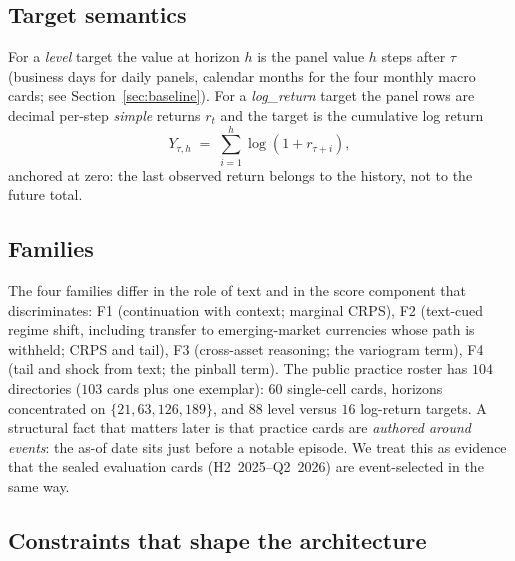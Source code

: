 \subsection{Target semantics}

For a \emph{level} target the value at horizon $h$ is the panel value $h$ steps after $\tau$ (business days for daily panels, calendar
months for the four monthly macro cards; see Section~\ref{sec:baseline}). For a \emph{log\_return} target the panel rows are decimal
per-step \emph{simple} returns $r_t$ and the target is the cumulative log return
\begin{equation}
  Y_{\tau,h} \;=\; \sum_{i=1}^{h}\log(1+r_{\tau+i}),
\end{equation}
anchored at zero: the last observed return belongs to the history, not to the future total.

\subsection{Families}

The four families differ in the role of text and in the score component that discriminates:
F1 (continuation with context; marginal CRPS), F2 (text-cued regime shift, including transfer to emerging-market currencies whose
path is withheld; CRPS and tail), F3 (cross-asset reasoning; the variogram term), F4 (tail and shock from text; the pinball term).
The public practice roster has $104$ directories ($103$ cards plus one exemplar): $60$ single-cell cards, horizons concentrated on
$\{21,63,126,189\}$, and $88$ level versus $16$ log-return targets. A structural fact that matters later is that practice cards are
\emph{authored around events}: the as-of date sits just before a notable episode. We treat this as evidence that the sealed evaluation
cards (H2~2025--Q2~2026) are event-selected in the same way.

\subsection{Constraints that shape the architecture}

